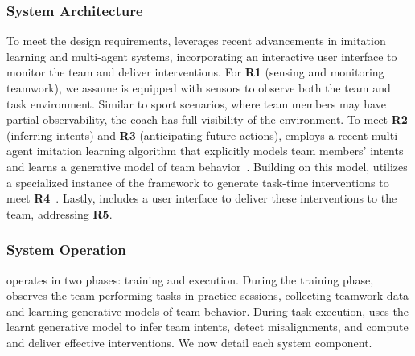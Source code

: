 \subsubsection{System Architecture}
To meet the design requirements, \coach leverages recent advancements in imitation learning and multi-agent systems, incorporating an interactive user interface to monitor the team and deliver interventions.
For \textbf{R1} (sensing and monitoring teamwork), we assume \coach is equipped with sensors to observe both the team and task environment. Similar to sport scenarios, where team members may have partial observability, the coach has full visibility of the environment.
To meet \textbf{R2} (inferring intents) and \textbf{R3} (anticipating future actions), \coach employs a recent multi-agent imitation learning algorithm \btil that explicitly models team members' intents and learns a generative model of team behavior~\cite{seo2022semi}.
Building on this model, \coach utilizes a specialized instance of the \tic framework to generate task-time interventions to meet \textbf{R4}~\cite{seo2023automated}.
Lastly, \coach includes a user interface to deliver these interventions to the team, addressing \textbf{R5}. 

\subsubsection{System Operation}
\coach operates in two phases: training and execution. During the training phase, \coach observes the team performing tasks in practice sessions, collecting teamwork data and learning generative models of team behavior. During task execution, \coach uses the learnt generative model to infer team intents, detect misalignments, and compute and deliver effective interventions. We now detail each system component.
